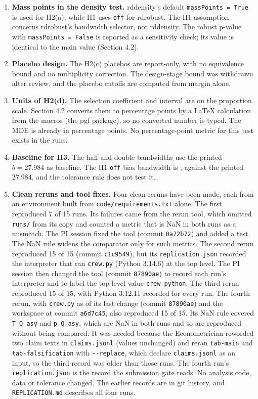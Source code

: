 \documentclass[11pt]{article}
\begin{document}
\begin{enumerate}
\item \textbf{Mass points in the density test.} rddensity's default \texttt{massPoints = True} is used for H2(a), while H1 uses \texttt{off} for rdrobust. The H1 assumption concerns rdrobust's bandwidth selector, not rddensity. The robust p-value with \texttt{massPoints = False} is reported as a sensitivity check; its value is identical to the main value (Section 4.2).
\item \textbf{Placebo design.} The H2(c) placebos are report-only, with no equivalence bound and no multiplicity correction. The design-stage bound was withdrawn after review, and the placebo cutoffs are computed from margin alone.
\item \textbf{Units of H2(d).} The selection coefficient and interval are on the proportion scale. Section 4.2 converts them to percentage points by a LaTeX calculation from the macros (the pgf package), so no converted number is typed. The MDE is already in percentage points. No percentage-point metric for this test exists in the runs.
\item \textbf{Baseline for H3.} The half and double bandwidths use the printed $b=27.984$ as baseline. The H1 \texttt{off} bias bandwidth is \RdBOff, against the printed 27.984, and the tolerance rule does not test it.
\item \textbf{Clean reruns and tool fixes.} Four clean reruns have been made, each from an environment built from \texttt{code/}\allowbreak\texttt{requirements.txt} alone. The first reproduced 7 of 15 runs. Its failures came from the rerun tool, which omitted \texttt{runs/} from its copy and counted a metric that is NaN in both runs as a mismatch. The PI session fixed the tool (commit \texttt{0a72b72}) and added a test. The NaN rule widens the comparator only for such metrics. The second rerun reproduced 15 of 15 (commit \texttt{c1c9549}), but its \texttt{replication.json} recorded the interpreter that ran \texttt{crew.py} (Python 3.14.6) at the top level. The PI session then changed the tool (commit \texttt{87890ae}) to record each run's interpreter and to label the top-level value \texttt{crew\_python}. The third rerun reproduced 15 of 15, with Python 3.12.11 recorded for every run. The fourth rerun, with \texttt{crew.py} as of its last change (commit \texttt{87890ae}) and the workspace at commit \texttt{a6d7c45}, also reproduced 15 of 15. Its NaN rule covered \texttt{T\_Q\_asy} and \texttt{p\_Q\_asy}, which are NaN in both runs and so are reproduced without being compared. It was needed because the Econometrician reworded two claim texts in \texttt{claims.jsonl} (values unchanged) and reran \texttt{tab-main} and \texttt{tab-falsification} with \texttt{-{}-replace}, which declare \texttt{claims.jsonl} as an input, so the third record was older than those runs. The fourth run's \texttt{replication.json} is the record the submission gate reads. No analysis code, data or tolerance changed. The earlier records are in git history, and \texttt{REPLICATION.md} describes all four runs.


\end{enumerate}
\end{document}
